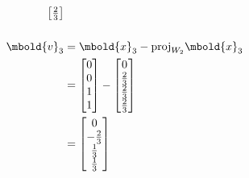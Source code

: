 \documentclass[12pt letter]{report}
\begin{document}
{{\begin{description}
\begin{align*}
\begin{bmatrix}
                                                                     \frac{2}{3} \\
                                                                   \end{bmatrix}                                                  \\
              \\
              \mbold{v}_3                                      & = \mbold{x}_3 - \text{proj}_{W_2}\mbold{x}_3                      \\
                                                               & = \begin{bmatrix} 0 \\ 0 \\ 1\\ 1 \end{bmatrix} - \begin{bmatrix}
                                                                                                                     0           \\
                                                                                                                     \frac{2}{3} \\
                                                                                                                     \frac{2}{3} \\
                                                                                                                     \frac{2}{3} \\
                                                                                                                   \end{bmatrix}  \\
                                                               & = \begin{bmatrix}
                                                                     0            \\
                                                                     -\frac{2}{3} \\
                                                                     \frac{1}{3}  \\
                                                                     \frac{1}{3}
                                                                   \end{bmatrix}                                                  \\

\end{align*}
\end{description}}}
\end{document}
